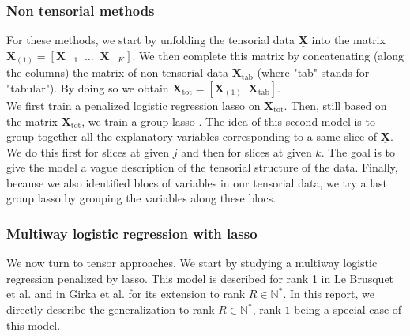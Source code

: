 \documentclass[10pt]{article}
\begin{document}
\subsubsection{Non tensorial methods}
For these methods, we start by unfolding the tensorial data $\underline{\mathbf{X}}$ into the matrix $\mathbf{X}_{(1)} = [\mathbf{X}_{:\,:1}\; \; \ldots \; \;\mathbf{X}_{:\,:K}]$. We then complete this matrix  by concatenating (along the columns) the matrix of non tensorial data $\mathbf{X}_{\text{tab}}$ (where "tab" stands for "tabular"). By doing so we obtain $\mathbf{X}_{\text{tot}} = [\mathbf{X}_{(1)} \; \; \mathbf{X}_{\text{tab}}]$.\\
\indent We first train a penalized logistic regression lasso on $\mathbf{X}_{\text{tot}}$. Then, still based on the matrix $\mathbf{X}_{\text{tot}}$, we train a group lasso \cite{grp_lasso}. The idea of this second model is to group together all the explanatory variables corresponding to a same slice of $\underline{\mathbf{X}}$. We do this first for slices at given $j$ and then for slices at given $k$.  The goal is to give the model a vague description of the tensorial structure of the data. Finally, because we also identified blocs of variables in our tensorial data, we try a last group lasso by grouping the variables along these blocs.

\subsubsection{Multiway logistic regression with lasso}
\indent We now turn to tensor approaches. We start by studying a multiway logistic regression penalized by lasso. This model is described for rank 1 in Le Brusquet et al. \cite{multi_rank_1} and in Girka et al. \cite{multi_rank_r} for its extension to rank $R \in \mathbb{N}^{*}$. In this report, we directly describe the generalization to rank $R \in \mathbb{N}^{*}$, rank $1$ being a special case of this model.\\[5 pt]
\end{document}
